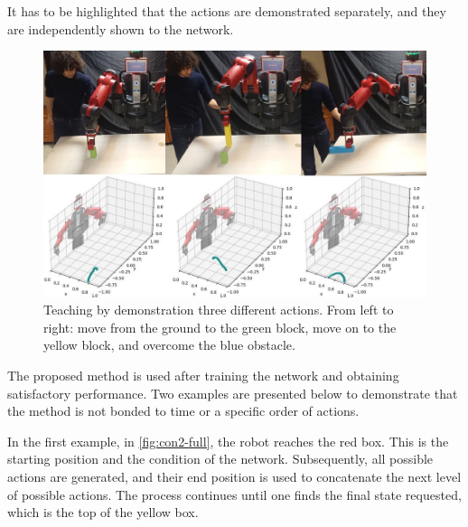 It has to be highlighted that the actions are demonstrated separately, and they are independently shown to the network.

\begin{figure}
    \centering
    \includegraphics[width=0.9\linewidth]{Images/baxter-train.JPG}
    \caption{ Teaching by demonstration three different actions. From left to right: move from the ground to the green block, move on to the yellow block, and overcome the blue obstacle. }
    \label{fig:baxter-train}
\end{figure}

The proposed method is used after training the network and obtaining satisfactory performance. 
Two examples are presented below to demonstrate that the method is not bonded to time or a specific order of actions.

In the first example, in \cref{fig:con2-full}, the robot reaches the red box. This is the starting position and the condition of the network. Subsequently, all possible actions are generated, and their end position is used to concatenate the next level of possible actions. The process continues until one finds the final state requested, which is the top of the yellow box. 

